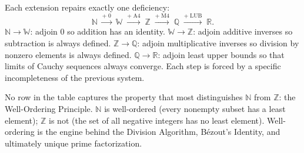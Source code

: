 \begin{remark}
Each extension repairs exactly one deficiency:
\[
\mathbb{N}
\;\xrightarrow{+\;0}\;
\mathbb{W}
\;\xrightarrow{+\;\text{A4}}\;
\mathbb{Z}
\;\xrightarrow{+\;\text{M4}}\;
\mathbb{Q}
\;\xrightarrow{+\;\text{LUB}}\;
\mathbb{R}.
\]
$\mathbb{N} \to \mathbb{W}$: adjoin $0$ so addition has an identity.
$\mathbb{W} \to \mathbb{Z}$: adjoin additive inverses so subtraction is
always defined.
$\mathbb{Z} \to \mathbb{Q}$: adjoin multiplicative inverses so division
by nonzero elements is always defined.
$\mathbb{Q} \to \mathbb{R}$: adjoin least upper bounds so that limits of
Cauchy sequences always converge.
Each step is forced by a specific incompleteness of the previous system.
\end{remark}

\begin{remark}
No row in the table captures the property that most distinguishes
$\mathbb{N}$ from $\mathbb{Z}$: the Well-Ordering Principle.
$\mathbb{N}$ is well-ordered (every nonempty subset has a least element);
$\mathbb{Z}$ is not (the set of all negative integers has no least element).
Well-ordering is the engine behind the Division Algorithm, Bézout's
Identity, and ultimately unique prime factorization.
\end{remark}
